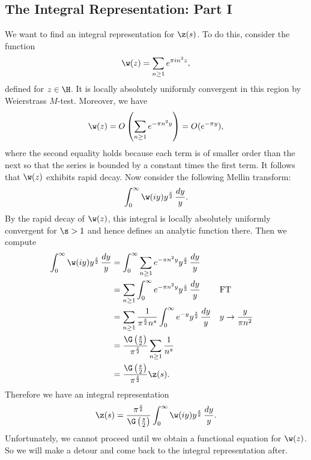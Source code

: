     \subsection*{The Integral Representation: Part I}
      We want to find an integral representation for $\z(s)$. To do this, consider the function
      \[
        \w(z) = \sum_{n \ge 1}e^{\pi in^{2}z},
      \]
      defined for $z \in \H$. It is locally absolutely uniformly convergent in this region by Weierstrass $M$-test. Moreover, we have
      \[
        \w(z) = O\left(\sum_{n \ge 1}e^{-\pi n^{2}y}\right) = O(e^{-\pi y}),
      \]
      where the second equality holds because each term is of smaller order than the next so that the series is bounded by a constant times the first term. It follows that $\w(z)$ exhibits rapid decay. Now consider the following Mellin transform:
      \[
        \int_{0}^{\infty}\w(iy)y^{\frac{s}{2}}\,\frac{dy}{y}.
      \]
      By the rapid decay of $\w(z)$, this integral is locally absolutely uniformly convergent for $\s > 1$ and hence defines an analytic function there. Then we compute
      \begin{align*}
        \int_{0}^{\infty}\w(iy)y^{\frac{s}{2}}\,\frac{dy}{y} &= \int_{0}^{\infty}\sum_{n \ge 1}e^{-\pi n^{2}y}y^{\frac{s}{2}}\,\frac{dy}{y} \\
        &= \sum_{n \ge 1}\int_{0}^{\infty}e^{-\pi n^{2}y}y^{\frac{s}{2}}\,\frac{dy}{y} && \text{FT} \\
        &= \sum_{n \ge 1}\frac{1}{\pi^{\frac{s}{2}}n^{s}}\int_{0}^{\infty}e^{-y}y^{\frac{s}{2}}\,\frac{dy}{y} && \text{$y \to \frac{y}{\pi n^{2}}$} \\
        &= \frac{\G\left(\frac{s}{2}\right)}{\pi^{\frac{s}{2}}}\sum_{n \ge 1}\frac{1}{n^{s}} \\
        &= \frac{\G\left(\frac{s}{2}\right)}{\pi^{\frac{s}{2}}}\z(s).
      \end{align*}
      Therefore we have an integral representation
      \begin{equation}\label{equ:integral_representation_zeta_1}
        \z(s) = \frac{\pi^{\frac{s}{2}}}{\G\left(\frac{s}{2}\right)}\int_{0}^{\infty}\w(iy)y^{\frac{s}{2}}\,\frac{dy}{y}.
      \end{equation}
      Unfortunately, we cannot proceed until we obtain a functional equation for $\w(z)$. So we will make a detour and come back to the integral representation after.
